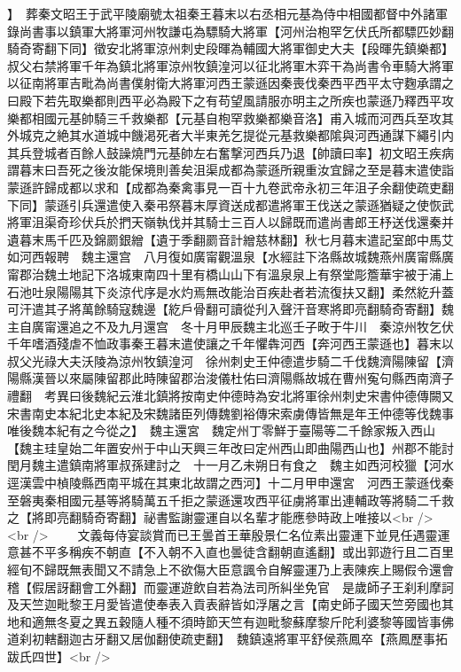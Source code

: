 】　葬秦文昭王于武平陵廟號太祖秦王暮末以右丞相元基為侍中相國都督中外諸軍錄尚書事以鎮軍大將軍河州牧謙屯為驃騎大將軍【河州治枹罕乞伏氏所都驃匹妙翻騎奇寄翻下同】徵安北將軍涼州刺史段暉為輔國大將軍御史大夫【段暉先鎮樂都】叔父右禁將軍千年為鎮北將軍涼州牧鎮湟河以征北將軍木弈干為尚書令車騎大將軍以征南將軍吉毗為尚書僕射衛大將軍河西王蒙遜因秦喪伐秦西平西平太守麴承謂之曰殿下若先取樂都則西平必為殿下之有苟望風請服亦明主之所疾也蒙遜乃釋西平攻樂都相國元基帥騎三千救樂都【元基自枹罕救樂都樂音洛】甫入城而河西兵至攻其外城克之絶其水道城中饑渇死者大半東羌乞提從元基救樂都隂與河西通謀下繩引内其兵登城者百餘人鼓譟燒門元基帥左右奮撃河西兵乃退【帥讀曰率】初文昭王疾病謂暮末曰吾死之後汝能保境則善矣沮渠成都為蒙遜所親重汝宜歸之至是暮末遣使詣蒙遜許歸成都以求和【成都為秦禽事見一百十九卷武帝永初三年沮子余翻使疏吏翻下同】蒙遜引兵還遣使入秦弔祭暮末厚資送成都遣將軍王伐送之蒙遜猶疑之使恢武將軍沮渠奇珍伏兵於捫天嶺執伐并其騎士三百人以歸既而遣尚書郎王杼送伐還秦并遺暮末馬千匹及錦罽銀繒【遺于季翻罽音計繒慈林翻】秋七月暮末遣記室郎中馬艾如河西報聘　魏主還宫　八月復如廣甯觀溫泉【水經註下洛縣故城魏燕州廣甯縣廣甯郡治魏土地記下洛城東南四十里有橋山山下有溫泉泉上有祭堂彫簷華宇被于浦上石池吐泉陽陽其下炎涼代序是水灼焉無改能治百疾赴者若流復扶又翻】柔然紇升蓋可汗遣其子將萬餘騎寇魏邊【紇戶骨翻可讀從刋入聲汗音寒將即亮翻騎奇寄翻】魏主自廣甯還追之不及九月還宫　冬十月甲辰魏主北巡壬子畋于牛川　秦涼州牧乞伏千年嗜酒殘虐不恤政事秦王暮末遣使讓之千年懼犇河西【奔河西王蒙遜也】暮末以叔父光祿大夫沃陵為涼州牧鎮湟河　徐州刺史王仲德遣步騎二千伐魏濟陽陳留【濟陽縣漢晉以來屬陳留郡此時陳留郡治浚儀杜佑曰濟陽縣故城在曹州寃句縣西南濟子禮翻　考異曰後魏紀云淮北鎮將按南史仲德時為安北將軍徐州刺史宋書仲德傳闕又宋書南史本紀北史本紀及宋魏諸臣列傳魏劉裕傳宋索虜傳皆無是年王仲德等伐魏事唯後魏本紀有之今從之】　魏主還宮　魏定州丁零鮮于臺陽等二千餘家叛入西山【魏主珪皇始二年置安州于中山天興三年改曰定州西山即曲陽西山也】州郡不能討閏月魏主遣鎮南將軍叔孫建討之　十一月乙未朔日有食之　魏主如西河校獵【河水逕漢雲中楨陵縣西南平城在其東北故謂之西河】十二月甲申還宮　河西王蒙遜伐秦至磐夷秦相國元基等將騎萬五千拒之蒙遜還攻西平征虜將軍出連輔政等將騎二千救之【將即亮翻騎奇寄翻】祕書監謝靈運自以名輩才能應參時政上唯接以<br />
<br />
　　文義每侍宴談賞而已王曇首王華殷景仁名位素出靈運下並見任遇靈運意甚不平多稱疾不朝直【不入朝不入直也曇徒含翻朝直遙翻】或出郭遊行且二百里經旬不歸既無表聞又不請急上不欲傷大臣意諷令自解靈運乃上表陳疾上賜假令還會稽【假居訝翻會工外翻】而靈運遊飲自若為法司所糾坐免官　是歲師子王刹利摩訶及天竺迦毗黎王月愛皆遣使奉表入貢表辭皆如浮屠之言【南史師子國天竺旁國也其地和適無冬夏之異五穀隨人種不須時節天竺有迦毗黎蘇摩黎斤陀利婆黎等國皆事佛道刹初轄翻迦古牙翻又居伽翻使疏吏翻】　魏鎮遠將軍平舒侯燕鳳卒【燕鳳歷事拓跋氏四世】<br />
